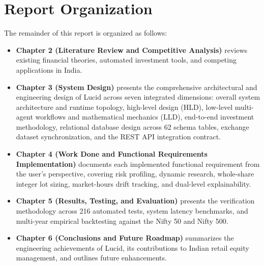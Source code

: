 \section{Report Organization}
The remainder of this report is organized as follows:
\begin{itemize}
    \item \textbf{Chapter 2 (Literature Review and Competitive Analysis)} reviews existing financial theories, automated investment tools, and competing applications in India.
    \item \textbf{Chapter 3 (System Design)} presents the comprehensive architectural and engineering design of Lucid across seven integrated dimensions: overall system architecture and runtime topology, high-level design (HLD), low-level multi-agent workflows and mathematical mechanics (LLD), end-to-end investment methodology, relational database design across 62 schema tables, exchange dataset synchronization, and the REST API integration contract.
    \item \textbf{Chapter 4 (Work Done and Functional Requirements Implementation)} documents each implemented functional requirement from the user's perspective, covering risk profiling, dynamic research, whole-share integer lot sizing, market-hours drift tracking, and dual-level explainability.
    \item \textbf{Chapter 5 (Results, Testing, and Evaluation)} presents the verification methodology across 216 automated tests, system latency benchmarks, and multi-year empirical backtesting against the Nifty 50 and Nifty 500.
    \item \textbf{Chapter 6 (Conclusions and Future Roadmap)} summarizes the engineering achievements of Lucid, its contributions to Indian retail equity management, and outlines future enhancements.
\end{itemize}
